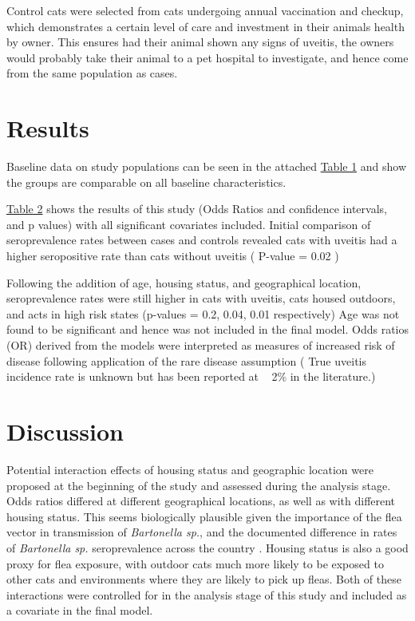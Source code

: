 \documentclass[11pt,twocolumn]{article}
\begin{document}
		Control cats were selected from cats undergoing annual vaccination and checkup, which demonstrates a certain level of care and investment in their animals health by owner. This ensures had their animal shown any signs of uveitis, the owners would probably take their animal to a pet hospital to investigate, and hence come from the same population as cases.


\section{Results}


		Baseline data on study populations can be seen in the attached \hyperref[tab:1]{Table 1} and show the groups are comparable on all baseline characteristics.


		\hyperref[tab:2]{Table 2} shows the results of this study (Odds Ratios and confidence intervals, and p values) with all significant covariates included.
		Initial comparison of seroprevalence rates between cases and controls revealed cats with uveitis had a higher seropositive rate than cats without uveitis ( P-value = 0.02 ) 


		Following the addition of age, housing status, and geographical location, seroprevalence rates were still higher in cats with uveitis, cats housed outdoors, and acts in high risk states (p-values = 0.2, 0.04, 0.01 respectively)
		Age was not found to be significant and hence was not included in the final model.
		Odds ratios (OR) derived from the models were interpreted as measures of increased risk of disease following application of the rare disease assumption ( True uveitis incidence rate is unknown but has been reported at ~ 2\% in the literature.)


\section{Discussion}
		Potential interaction effects of housing status and geographic location were proposed at the beginning of the study and assessed during the analysis stage.
		Odds ratios differed at different geographical locations, as well as with different housing status.
		This seems biologically plausible given the importance of the flea vector in transmission of \emph{Bartonella sp.}, and the documented difference in rates of \emph{Bartonella sp.} seroprevalence across the country \cite{Jameson1995a}.
		Housing status is also a good proxy for flea exposure, with outdoor cats much more likely to be exposed to other cats and environments where they are likely to pick up fleas.
		Both of these interactions were controlled for in the analysis stage of this study and included as a covariate in the final model.
\end{document}
